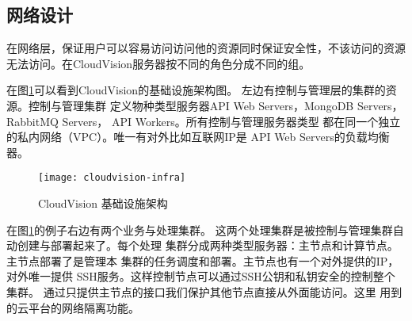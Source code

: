 \subsection{网络设计}
在网络层，保证用户可以容易访问访问他的资源同时保证安全性，不该访问的资源
无法访问。在CloudVision服务器按不同的角色分成不同的组。

在图\ref{fig:cloudvision-infra}可以看到CloudVision的基础设施架构图。
左边有控制与管理层的集群的资源。控制与管理集群
定义物种类型服务器API Web Servers，MongoDB Servers，
RabbitMQ Servers， API Workers。所有控制与管理服务器类型
都在同一个独立的私内网络（VPC）。唯一有对外比如互联网IP是
API Web Servers的负载均衡器。
\begin{figure}[h]
  \centering
    \texttt{[image: cloudvision-infra]}
  \caption{CloudVision 基础设施架构}
  \label{fig:cloudvision-infra}
\end{figure}

在图\ref{fig:cloudvision-infra}的例子右边有两个业务与处理集群。
这两个处理集群是被控制与管理集群自动创建与部署起来了。每个处理
集群分成两种类型服务器：主节点和计算节点。主节点部署了是管理本
集群的任务调度和部署。主节点也有一个对外提供的IP，对外唯一提供
SSH服务。这样控制节点可以通过SSH公钥和私钥安全的控制整个集群。
通过只提供主节点的接口我们保护其他节点直接从外面能访问。这里
用到的云平台的网络隔离功能。


